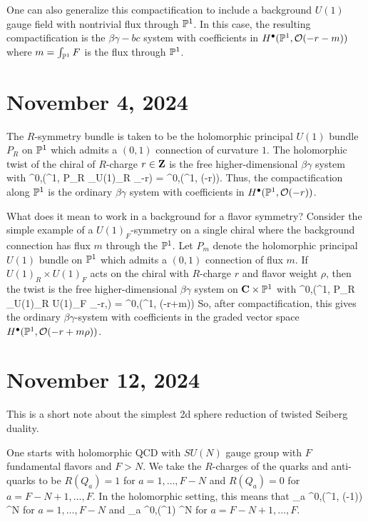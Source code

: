 \documentclass[11pt]{amsart}
\begin{document}
One can also generalize this compactification to include a background $U(1)$ gauge field with nontrivial flux through $\mathbb P^1$.
In this case, the resulting compactification is the $\beta\gamma-bc$ system with coefficients in $H^\bullet(\mathbb P^1, \mathcal O(-r-m))$ where $m = \int_{\mathbb P^1} F$ is the flux through $\mathbb P^1$.

\section{November 4, 2024}

The $R$-symmetry bundle is taken to be the holomorphic principal $U(1)$ bundle $P_R$ on $\mathbb P^1$ which admits a $(0,1)$ connection of curvature $1$.
The holomorphic twist of the chiral of $R$-charge $r \in\mathbf{Z}$ is the free higher-dimensional $\beta\gamma$ system with
\beqn
\gamma \in \Omega^{0,\bu}(\C \times \PP^1, P_R \times_{U(1)_R} \C_{-r}) = \Omega^{0,\bu}(\C \times \PP^1, \cO(-r)).
\eeqn
Thus, the compactification along $\mathbb P^1$ is the ordinary $\beta\gamma$ system with coefficients in $H^\bullet(\mathbb P^1, \mathcal O(-r))$.


What does it mean to work in a background for a flavor symmetry?
Consider the simple example of a $U(1)_F$-symmetry on a single chiral where the background connection has flux $m$ through the $\mathbb P^1$.
Let $P_{m}$ denote the holomorphic principal $U(1)$ bundle on $\mathbb P^1$ which admits a $(0,1)$ connection of flux $m$.
If $U(1)_R \times U(1)_F$ acts on the chiral with $R$-charge $r$ and flavor weight $\rho$, then the twist is the free higher-dimensional $\beta\gamma$ system on $\mathbf{C} \times \mathbb P^1$ with
\beqn
\gamma \in \Omega^{0,\bu}(\C \times \PP^1, P_R \times_{U(1)_R \times U(1)_F} \C_{-r,\rho}) = \Omega^{0,\bu}(\C \times \PP^1, \cO(-r+m\rho)) 
\eeqn
So, after compactification, this gives the ordinary $\beta\gamma$-system with coefficients in the graded vector space $H^\bullet(\mathbb P^1, \mathcal O(-r+m\rho))$.



\section{November 12, 2024}

This is a short note about the simplest 2d sphere reduction of twisted Seiberg duality.

One starts with holomorphic QCD with $SU(N)$ gauge group with $F$ fundamental flavors and $F > N$.
We take the $R$-charges of the quarks and anti-quarks to be $R(Q_a)=1$ for $a = 1,\ldots, F-N$ and $R(Q_a) = 0$ for $a = F-N+1,\ldots,F$.
In the holomorphic setting, this means that
\beqn
\gamma_a \in \Omega^{0,\bu}(\C \times \PP^1, \cO(-1)) \otimes \C^N
\eeqn
for $a = 1,\ldots, F-N$ and 
\beqn
\gamma_a \in \Omega^{0,\bu}(\C \times \PP^1) \otimes \C^N
\eeqn
for $a=F-N+1,\ldots, F$. 
\end{document}
